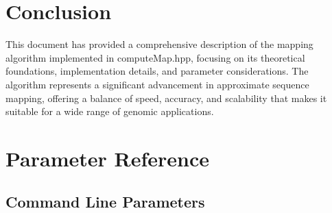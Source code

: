 \documentclass{article}
\begin{document}
\section{Conclusion}

This document has provided a comprehensive description of the mapping algorithm implemented in computeMap.hpp, focusing on its theoretical foundations, implementation details, and parameter considerations. The algorithm represents a significant advancement in approximate sequence mapping, offering a balance of speed, accuracy, and scalability that makes it suitable for a wide range of genomic applications.

\appendix
\section{Parameter Reference}

\subsection{Command Line Parameters}
\end{document}
